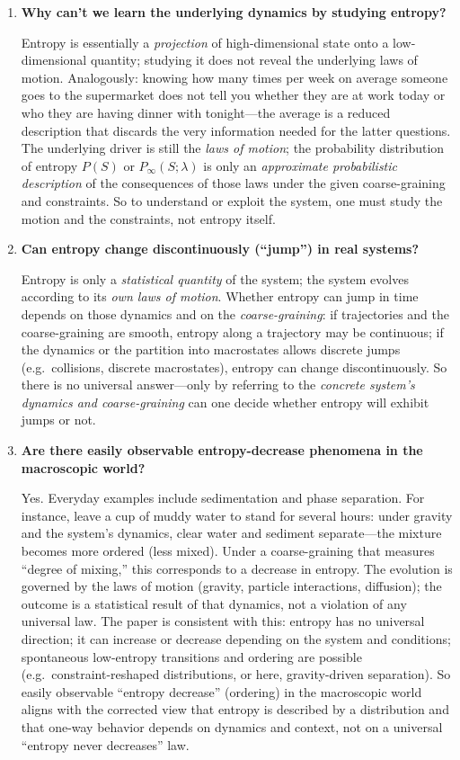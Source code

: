 \documentclass[11pt,a4paper]{article}
\begin{document}
\begin{enumerate}[leftmargin=*]
\item \textbf{Why can't we learn the underlying dynamics by studying entropy?}

Entropy is essentially a \emph{projection} of high-dimensional state onto a low-dimensional quantity; studying it does not reveal the underlying laws of motion. Analogously: knowing how many times per week on average someone goes to the supermarket does not tell you whether they are at work today or who they are having dinner with tonight---the average is a reduced description that discards the very information needed for the latter questions. The underlying driver is still the \emph{laws of motion}; the probability distribution of entropy $P(S)$ or $P_{\infty}(S;\lambda)$ is only an \emph{approximate probabilistic description} of the consequences of those laws under the given coarse-graining and constraints. So to understand or exploit the system, one must study the motion and the constraints, not entropy itself.

\item \textbf{Can entropy change discontinuously (``jump'') in real systems?}

Entropy is only a \emph{statistical quantity} of the system; the system evolves according to its \emph{own laws of motion}. Whether entropy can jump in time depends on those dynamics and on the \emph{coarse-graining}: if trajectories and the coarse-graining are smooth, entropy along a trajectory may be continuous; if the dynamics or the partition into macrostates allows discrete jumps (e.g.\ collisions, discrete macrostates), entropy can change discontinuously. So there is no universal answer---only by referring to the \emph{concrete system's dynamics and coarse-graining} can one decide whether entropy will exhibit jumps or not.

\item \textbf{Are there easily observable entropy-decrease phenomena in the macroscopic world?}

Yes. Everyday examples include sedimentation and phase separation. For instance, leave a cup of muddy water to stand for several hours: under gravity and the system's dynamics, clear water and sediment separate---the mixture becomes more ordered (less mixed). Under a coarse-graining that measures ``degree of mixing,'' this corresponds to a decrease in entropy. The evolution is governed by the laws of motion (gravity, particle interactions, diffusion); the outcome is a statistical result of that dynamics, not a violation of any universal law. The paper is consistent with this: entropy has no universal direction; it can increase or decrease depending on the system and conditions; spontaneous low-entropy transitions and ordering are possible (e.g.\ constraint-reshaped distributions, or here, gravity-driven separation). So easily observable ``entropy decrease'' (ordering) in the macroscopic world aligns with the corrected view that entropy is described by a distribution and that one-way behavior depends on dynamics and context, not on a universal ``entropy never decreases'' law.


\end{enumerate}
\end{document}
